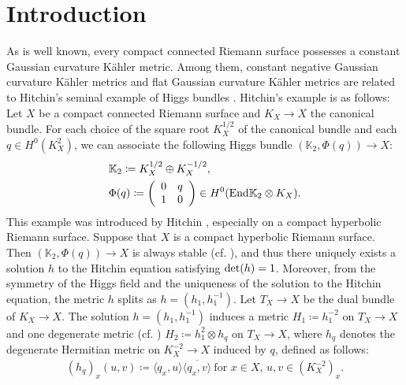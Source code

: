 \documentclass[12pt]{article}
\theoremstyle{definition}
\def\det{{\rm det}}
\def\End{{\rm End}}
\def\det{{\rm det}}
\def\K{{\mathbb K}}
\begin{document}
\section{Introduction}
As is well known, every compact connected Riemann surface possesses a constant Gaussian curvature K\"ahler metric. Among them, constant negative Gaussian curvature K\"ahler metrics and flat Gaussian curvature K\"ahler metrics are related to Hitchin's seminal example of Higgs bundles \cite{Hit1}. Hitchin's example is as follows: Let $X$ be a compact connected Riemann surface and $K_X\rightarrow X$ the canonical bundle. For each choice of the square root $K_X^{1/2}$ of the canonical bundle and each $q\in H^0(K_X^2)$, we can associate the following Higgs bundle $(\K_2,\Phi(q))\rightarrow X$:
\begin{align*}
&\K_2\coloneqq K_X^{1/2}\oplus K_X^{-1/2}, \\ 
&\Phi(q)\coloneqq 
\left(
\begin{array}{cc}
0 & q \\ 
1 &0 
\end{array}
\right)\in H^0(\End \K_2\otimes K_X).
\end{align*}
This example was introduced by Hitchin \cite[Section 11]{Hit1}, especially on a compact hyperbolic Riemann surface. Suppose that $X$ is a compact hyperbolic Riemann surface. Then $(\K_2,\Phi(q))\rightarrow X$ is always stable (cf. \cite{Hit1}), and thus there uniquely exists a solution $h$ to the Hitchin equation satisfying $\det(h)=1$. Moreover, from the symmetry of the Higgs field and the uniqueness of the solution to the Hitchin equation, the metric $h$ splits as $h=(h_1,h_1^{-1})$. Let $T_X\rightarrow X$ be the dual bundle of $K_X\rightarrow X$. The solution $h=(h_1,h_1^{-1})$ induces a metric $H_1\coloneqq h_1^{-2}$ on $T_X\rightarrow X$ and one degenerate metric (cf. \cite[Theorem (11.2)]{Hit1}) $H_2\coloneqq h_1^2\otimes h_q$ on $T_X\rightarrow X$, where $h_q$ denotes the degenerate Hermitian metric on $K_X^{-2}\rightarrow X$ induced by $q$, defined as follows:
\begin{align}
(h_q)_x(u,v)\coloneqq \langle q_x,u\rangle\overline{\langle q_x,v\rangle} \ \text{for $x\in X$, $u,v\in (K_X^{-2})_x$}. \label{uv}
\end{align}
\end{document}
